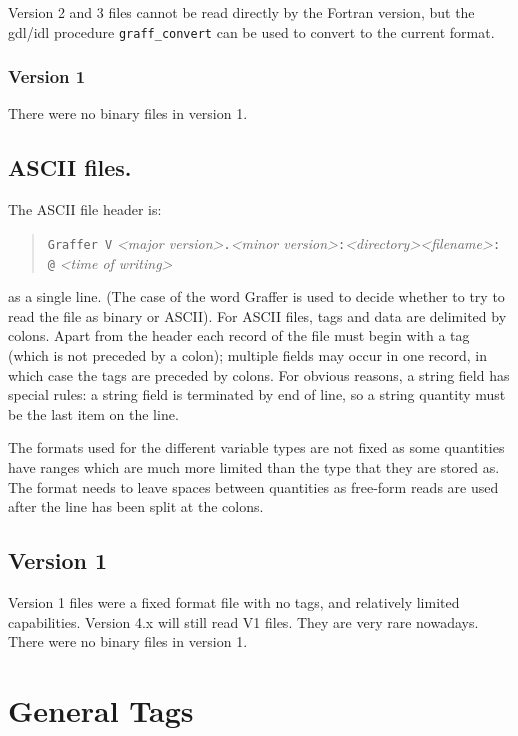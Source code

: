 \documentclass[english]{article}
\begin{document}
Version 2 and 3 files cannot be read directly by the Fortran version,
but the gdl/idl procedure \texttt{graff\_convert} can be used to
convert to the current format.

\subsubsection{Version 1}
\label{sec:vers1}

There were no binary files in version 1.

\subsection{ASCII files.}

The ASCII file header is:
\begin{quote}
  \texttt{Graffer V} \emph{<major version>}\texttt{.}\emph{<minor
    version>}\texttt{:}\emph{<directory><filename>}\texttt{: @}
  \emph{<time of writing>}
\end{quote}
as a single line. (The case of the word Graffer is used to decide
whether to try to read the file as binary or ASCII).
For ASCII files, tags and data are delimited by colons. Apart from
the header each record of the file must begin with a tag (which is
not preceded by a colon); multiple fields may occur in one record,
in which case the tags are preceded by colons. For obvious reasons,
a string field has special rules: a string field is terminated by
end of line, so a string quantity must be the last item on the line.


The formats used for the different variable types are not fixed as
some quantities have ranges which are much more limited than the type
that they are stored as. The format needs to leave spaces between quantities
as free-form reads are used after the line has been split at the colons.

\subsection{Version 1}
\label{sec:vers1}

Version 1 files were a fixed format file with no tags, and relatively
limited capabilities. Version 4.x will still read V1 files. They are
very rare nowadays. There were no binary files in version 1.


\section{General Tags}
\end{document}

